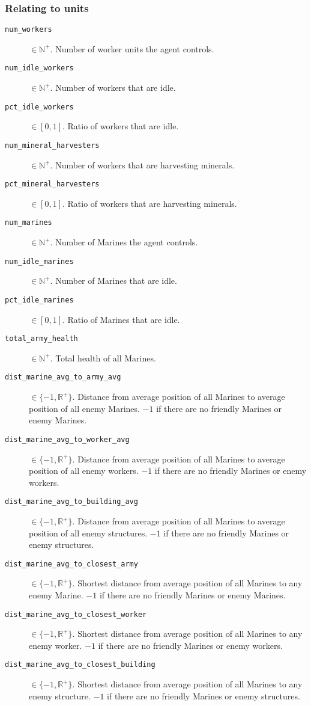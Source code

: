 \subsubsection*{Relating to units}
\begin{description}
    \item[\texttt{num\_workers}] $\in \mathbb{N}^+$. Number of worker units the agent controls.
    \item[\texttt{num\_idle\_workers}] $\in \mathbb{N}^+$. Number of workers that are idle.
    \item[\texttt{pct\_idle\_workers}] $\in [0,1]$. Ratio of workers that are idle.
    \item[\texttt{num\_mineral\_harvesters}] $\in \mathbb{N}^+$. Number of workers that are harvesting minerals.
    \item[\texttt{pct\_mineral\_harvesters}] $\in [0,1]$. Ratio of workers that are harvesting minerals.
    \item[\texttt{num\_marines}] $\in \mathbb{N}^+$. Number of Marines the agent controls.
    \item[\texttt{num\_idle\_marines}] $\in \mathbb{N}^+$. Number of Marines that are idle.
    \item[\texttt{pct\_idle\_marines}] $\in [0,1]$. Ratio of Marines that are idle.
    \item[\texttt{total\_army\_health}] $\in \mathbb{N}^+$. Total health of all Marines.
    \item[\texttt{dist\_marine\_avg\_to\_army\_avg}] $\in \{-1, \mathbb{R}^+\}$. Distance from average position of all Marines to average position of all enemy Marines. $-1$ if there are no friendly Marines or enemy Marines.
    \item[\texttt{dist\_marine\_avg\_to\_worker\_avg}] $\in \{-1, \mathbb{R}^+\}$. Distance from average position of all Marines to average position of all enemy workers. $-1$ if there are no friendly Marines or enemy workers.
    \item[\texttt{dist\_marine\_avg\_to\_building\_avg}] $\in \{-1, \mathbb{R}^+\}$. Distance from average position of all Marines to average position of all enemy structures. $-1$ if there are no friendly Marines or enemy structures.
    \item[\texttt{dist\_marine\_avg\_to\_closest\_army}] $\in \{-1, \mathbb{R}^+\}$. Shortest distance from average position of all Marines to any enemy Marine. $-1$ if there are no friendly Marines or enemy Marines.
    \item[\texttt{dist\_marine\_avg\_to\_closest\_worker}] $\in \{-1, \mathbb{R}^+\}$. Shortest distance from average position of all Marines to any enemy worker. $-1$ if there are no friendly Marines or enemy workers.
    \item[\texttt{dist\_marine\_avg\_to\_closest\_building}] $\in \{-1, \mathbb{R}^+\}$. Shortest distance from average position of all Marines to any enemy structure. $-1$ if there are no friendly Marines or enemy structures.
\end{description}

